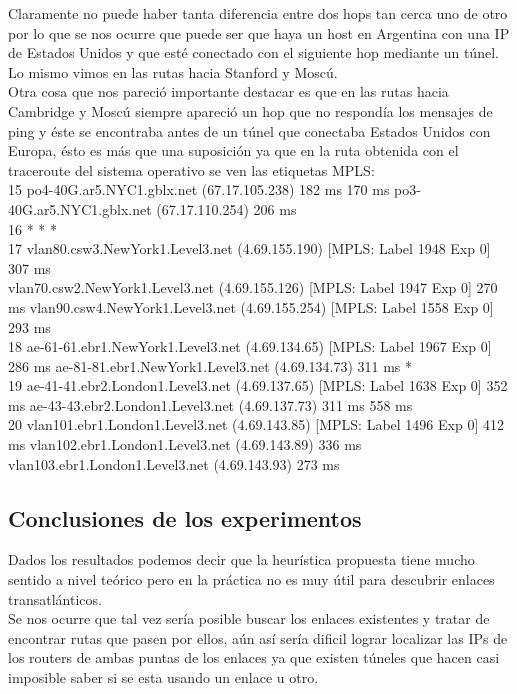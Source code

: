 Claramente no puede haber tanta diferencia entre dos hops tan cerca uno de otro por lo que se nos ocurre que puede ser que haya un host en Argentina con una IP de Estados Unidos y que esté conectado con el siguiente hop mediante un túnel. Lo mismo vimos en las rutas hacia Stanford y Moscú.\\

Otra cosa que nos pareció importante destacar es que en las rutas hacia Cambridge y Moscú siempre apareció un hop que no respondía los mensajes de ping y éste se encontraba antes de un túnel que conectaba Estados Unidos con Europa, ésto es más que una suposición ya que en la ruta obtenida con el traceroute del sistema operativo se ven las etiquetas MPLS:\\
15 po4-40G.ar5.NYC1.gblx.net (67.17.105.238)  182 ms  170 ms po3-40G.ar5.NYC1.gblx.net (67.17.110.254)  206 ms\\
16  * * *\\
17  vlan80.csw3.NewYork1.Level3.net (4.69.155.190) [MPLS: Label 1948 Exp 0]  307 ms\\ vlan70.csw2.NewYork1.Level3.net (4.69.155.126) [MPLS: Label 1947 Exp 0]  270 ms vlan90.csw4.NewYork1.Level3.net (4.69.155.254) [MPLS: Label 1558 Exp 0]  293 ms\\
18  ae-61-61.ebr1.NewYork1.Level3.net (4.69.134.65) [MPLS: Label 1967 Exp 0]  286 ms ae-81-81.ebr1.NewYork1.Level3.net (4.69.134.73)  311 ms *\\
19  ae-41-41.ebr2.London1.Level3.net (4.69.137.65) [MPLS: Label 1638 Exp 0]  352 ms ae-43-43.ebr2.London1.Level3.net (4.69.137.73)  311 ms  558 ms\\
20  vlan101.ebr1.London1.Level3.net (4.69.143.85) [MPLS: Label 1496 Exp 0]  412 ms vlan102.ebr1.London1.Level3.net (4.69.143.89)  336 ms vlan103.ebr1.London1.Level3.net (4.69.143.93)  273 ms\\


\subsection{Conclusiones de los experimentos}
Dados los resultados podemos decir que la heurística propuesta tiene mucho sentido a nivel teórico pero en la práctica no es muy útil para descubrir enlaces transatlánticos.\\
Se nos ocurre que tal vez sería posible buscar los enlaces existentes y tratar de encontrar rutas que pasen por ellos, aún así sería dificil lograr localizar las IPs de los routers de ambas puntas de los enlaces ya que existen túneles que hacen casi imposible saber si se esta usando un enlace u otro.\\
